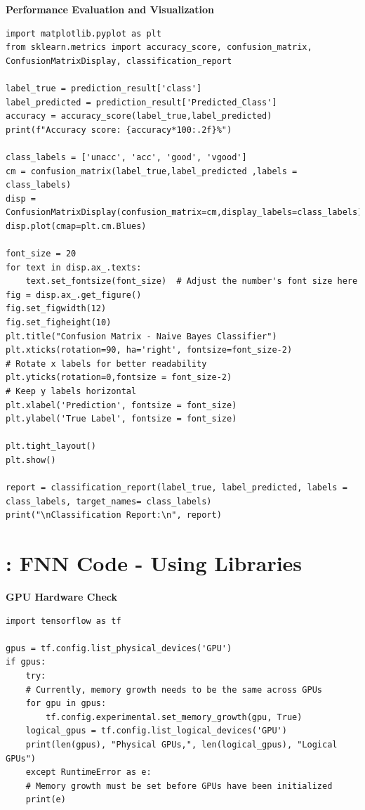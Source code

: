 \documentclass[a4paper]{article}
\begin{document}
\textbf{Performance Evaluation and Visualization}
\begin{lstlisting}
import matplotlib.pyplot as plt 
from sklearn.metrics import accuracy_score, confusion_matrix, ConfusionMatrixDisplay, classification_report

label_true = prediction_result['class']
label_predicted = prediction_result['Predicted_Class']
accuracy = accuracy_score(label_true,label_predicted)
print(f"Accuracy score: {accuracy*100:.2f}%")

class_labels = ['unacc', 'acc', 'good', 'vgood']
cm = confusion_matrix(label_true,label_predicted ,labels = class_labels)
disp = ConfusionMatrixDisplay(confusion_matrix=cm,display_labels=class_labels)
disp.plot(cmap=plt.cm.Blues)

font_size = 20
for text in disp.ax_.texts:
    text.set_fontsize(font_size)  # Adjust the number's font size here
fig = disp.ax_.get_figure()
fig.set_figwidth(12)
fig.set_figheight(10) 
plt.title("Confusion Matrix - Naive Bayes Classifier")
plt.xticks(rotation=90, ha='right', fontsize=font_size-2)                     # Rotate x labels for better readability
plt.yticks(rotation=0,fontsize = font_size-2)                                  # Keep y labels horizontal
plt.xlabel('Prediction', fontsize = font_size)
plt.ylabel('True Label', fontsize = font_size)

plt.tight_layout()
plt.show()

report = classification_report(label_true, label_predicted, labels = class_labels, target_names= class_labels)
print("\nClassification Report:\n", report)
\end{lstlisting}

\newpage
\section{\hspace{-5mm}: FNN Code - Using Libraries}
\label{section:ann_mnist}
\textbf{GPU Hardware Check}
\begin{lstlisting}
import tensorflow as tf

gpus = tf.config.list_physical_devices('GPU')
if gpus:
    try:
    # Currently, memory growth needs to be the same across GPUs
    for gpu in gpus:
        tf.config.experimental.set_memory_growth(gpu, True)
    logical_gpus = tf.config.list_logical_devices('GPU')
    print(len(gpus), "Physical GPUs,", len(logical_gpus), "Logical GPUs")
    except RuntimeError as e:
    # Memory growth must be set before GPUs have been initialized
    print(e)
\end{lstlisting}
\end{document}

